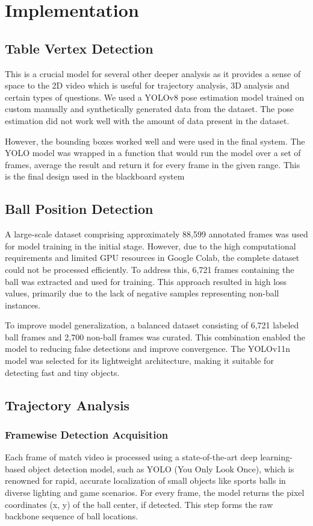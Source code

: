 \documentclass[conference]{IEEEtran}
\begin{document}
\section{Implementation}

\subsection{Table Vertex Detection}
This is a crucial model for several other deeper analysis as it provides a sense of space to the 2D video which is useful for trajectory analysis, 3D analysis and certain types of questions. We used a YOLOv8 pose estimation model trained on custom manually and synthetically generated data from the dataset. The pose estimation did not work well with the amount of data present in the dataset.

However, the bounding boxes worked well and were used in the final system. The YOLO model was wrapped in a function that would run the model over a set of frames, average the result and return it for every frame in the given range. This is the final design used in the blackboard system

\subsection{Ball Position Detection}
A large-scale dataset comprising approximately 88,599 annotated frames was used for model training in the initial stage. However, due to the high computational requirements and limited GPU resources in Google Colab, the complete dataset could not be processed efficiently. To address this, 6,721 frames containing the ball was extracted and used for training. This approach resulted in high loss values, primarily due to the lack of negative samples representing non-ball instances.

To improve model generalization, a balanced dataset consisting of 6,721 labeled ball frames and 2,700 non-ball frames was curated. This combination enabled the model to reducing false detections and improve convergence. The YOLOv11n model was selected for its lightweight architecture, making it suitable for detecting fast and tiny objects.

\subsection{Trajectory Analysis}
\subsubsection{Framewise Detection Acquisition}
Each frame of match video is processed using a state-of-the-art deep learning-based object detection model, such as YOLO (You Only Look Once), which is renowned for rapid, accurate localization of small objects like sports balls in diverse lighting and game scenarios. For every frame, the model returns the pixel coordinates (x, y) of the ball center, if detected. This step forms the raw backbone sequence of ball locations.
\end{document}
